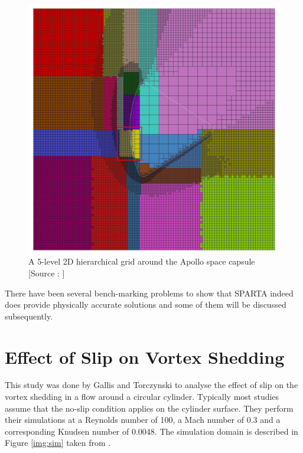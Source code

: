 \begin{figure}[H]
  \includegraphics[scale=0.5]{Pictures/Chapter_4_SPARTA/Parallel.png}
  \centering
  \caption{A 5-level 2D hierarchical grid around the Apollo space capsule [Source : \cite{plimpton2019direct}]}
  \label{img:parallel}
\end{figure}

\no There have been several bench-marking problems to show that SPARTA indeed does provide physically accurate solutions and some of them will be discussed subsequently.

\section{Effect of Slip on Vortex Shedding}

This study was done by Gallis and Torczynski \cite{gallis2021effect} to analyse the effect of slip on the vortex shedding in a flow around a circular cylinder. Typically most studies assume that the no-slip condition applies on the cylinder surface. They perform their simulations at a Reynolds number of 100, a Mach number of 0.3 and a corresponding Knudsen number of 0.0048. The simulation domain is described in Figure \ref{img:sim} taken from \cite{gallis2021effect}.

